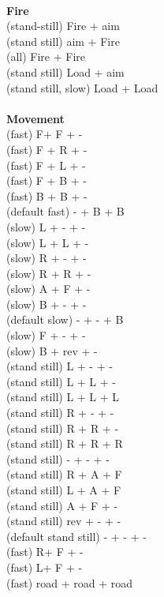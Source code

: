 \ \\ {\bf Fire } \\
(stand-still) Fire + aim \\
(stand still) aim + Fire \\
(all) Fire + Fire  \\
(stand still) Load + aim \\
(stand still, slow) Load + Load \\
\ \\ {\bf Movement } \\
(fast) F+ F + - \\
(fast) F + R + - \\
(fast) F + L + - \\
(fast) F + B + - \\
(fast) B + B + - \\
(default fast) - + B + B \\
(slow) L + - + - \\
(slow) L + L + - \\
(slow) R + - + - \\
(slow) R + R + - \\
(slow) A + F + - \\
(slow) B + - + - \\
(default slow) - + - + B \\
(slow) F + - + - \\
(slow) B + rev + - \\
(stand still) L + - + - \\
(stand still) L + L + - \\
(stand still) L + L + L \\
(stand still) R + - + - \\
(stand still) R + R + - \\
(stand still) R + R + R \\
(stand still) - + - + - \\
(stand still) R + A + F \\
(stand still) L + A + F \\
(stand still) A + F + - \\
(stand still) rev + - + - \\
(default stand still) - + - + - \\
(fast) R+ F + - \\
(fast) L+ F + - \\
(fast) road + road + road \\



